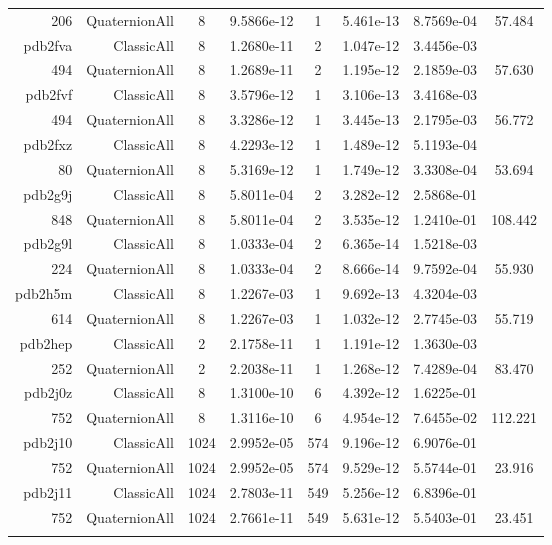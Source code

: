 \begin{xltabular}{\textwidth}{r|rcS[table-format=1.4e+2]cS[table-format=1.3e+2]S[table-format=1.4e+2]S[table-format=-1.3]}
206 & QuaternionAll & 8 & 9.5866e-12 & 1 & 5.461e-13 & 8.7569e-04 & 57.484\\  \addlinespace
pdb2fva & ClassicAll & 8 & 1.2680e-11 & 2 & 1.047e-12 & 3.4456e-03 & \\
494 & QuaternionAll & 8 & 1.2689e-11 & 2 & 1.195e-12 & 2.1859e-03 & 57.630\\  \addlinespace
pdb2fvf & ClassicAll & 8 & 3.5796e-12 & 1 & 3.106e-13 & 3.4168e-03 & \\
494 & QuaternionAll & 8 & 3.3286e-12 & 1 & 3.445e-13 & 2.1795e-03 & 56.772\\  \addlinespace
pdb2fxz & ClassicAll & 8 & 4.2293e-12 & 1 & 1.489e-12 & 5.1193e-04 & \\
80 & QuaternionAll & 8 & 5.3169e-12 & 1 & 1.749e-12 & 3.3308e-04 & 53.694\\  \addlinespace
pdb2g9j & ClassicAll & 8 & 5.8011e-04 & 2 & 3.282e-12 & 2.5868e-01 & \\
848 & QuaternionAll & 8 & 5.8011e-04 & 2 & 3.535e-12 & 1.2410e-01 & 108.442\\  \addlinespace
pdb2g9l & ClassicAll & 8 & 1.0333e-04 & 2 & 6.365e-14 & 1.5218e-03 & \\
224 & QuaternionAll & 8 & 1.0333e-04 & 2 & 8.666e-14 & 9.7592e-04 & 55.930\\  \addlinespace
pdb2h5m & ClassicAll & 8 & 1.2267e-03 & 1 & 9.692e-13 & 4.3204e-03 & \\
614 & QuaternionAll & 8 & 1.2267e-03 & 1 & 1.032e-12 & 2.7745e-03 & 55.719\\  \addlinespace
pdb2hep & ClassicAll & 2 & 2.1758e-11 & 1 & 1.191e-12 & 1.3630e-03 & \\
252 & QuaternionAll & 2 & 2.2038e-11 & 1 & 1.268e-12 & 7.4289e-04 & 83.470\\  \addlinespace
pdb2j0z & ClassicAll & 8 & 1.3100e-10 & 6 & 4.392e-12 & 1.6225e-01 & \\
752 & QuaternionAll & 8 & 1.3116e-10 & 6 & 4.954e-12 & 7.6455e-02 & 112.221\\  \addlinespace
pdb2j10 & ClassicAll & 1024 & 2.9952e-05 & 574 & 9.196e-12 & 6.9076e-01 & \\
752 & QuaternionAll & 1024 & 2.9952e-05 & 574 & 9.529e-12 & 5.5744e-01 & 23.916\\  \addlinespace
pdb2j11 & ClassicAll & 1024 & 2.7803e-11 & 549 & 5.256e-12 & 6.8396e-01 & \\
752 & QuaternionAll & 1024 & 2.7661e-11 & 549 & 5.631e-12 & 5.5403e-01 & 23.451\\  \addlinespace

\end{xltabular}
